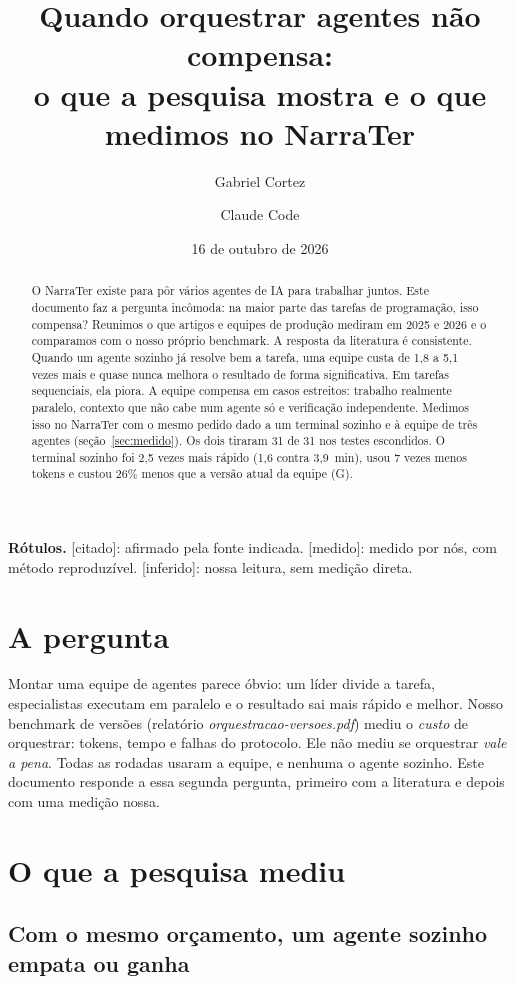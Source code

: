 \documentclass[11pt,a4paper]{article}
\title{Quando orquestrar agentes não compensa:\\[2pt]
\large o que a pesquisa mostra e o que medimos no NarraTer}
\author{Gabriel Cortez \and Claude Code}
\date{16 de outubro de 2026}
\newcommand{\rot}[1]{\textsf{\footnotesize[#1]}}
\begin{document}
\maketitle

\begin{abstract}
\noindent
O NarraTer existe para pôr vários agentes de IA para trabalhar juntos. Este documento faz a
pergunta incômoda: na maior parte das tarefas de programação, isso compensa? Reunimos o que
artigos e equipes de produção mediram em 2025 e 2026 e o comparamos com o nosso próprio benchmark.
A resposta da literatura é consistente. Quando um agente sozinho já resolve bem a tarefa, uma equipe
custa de 1,8 a 5,1 vezes mais e quase nunca melhora o resultado de forma significativa. Em tarefas
sequenciais, ela piora. A equipe compensa em casos estreitos: trabalho realmente paralelo, contexto
que não cabe num agente só e verificação independente. Medimos isso no NarraTer com o mesmo pedido
dado a um terminal sozinho e à equipe de três agentes (seção~\ref{sec:medido}). Os dois tiraram
31 de 31 nos testes escondidos. O terminal sozinho foi 2,5 vezes mais rápido (1,6 contra 3,9~min),
usou 7 vezes menos tokens e custou 26\% menos que a versão atual da equipe (G).
\end{abstract}

\noindent\textbf{Rótulos.} \rot{citado}: afirmado pela fonte indicada. \rot{medido}: medido por nós,
com método reproduzível. \rot{inferido}: nossa leitura, sem medição direta.

\section{A pergunta}

Montar uma equipe de agentes parece óbvio: um líder divide a tarefa, especialistas executam em paralelo
e o resultado sai mais rápido e melhor. Nosso benchmark de versões (relatório
\emph{orquestracao-versoes.pdf}) mediu o \emph{custo} de orquestrar: tokens, tempo e falhas do
protocolo. Ele não mediu se orquestrar \emph{vale a pena}. Todas as rodadas usaram a equipe, e
nenhuma o agente sozinho. Este documento responde a essa segunda pergunta, primeiro com a literatura
e depois com uma medição nossa.

\section{O que a pesquisa mediu}

\subsection{Com o mesmo orçamento, um agente sozinho empata ou ganha}
\end{document}
